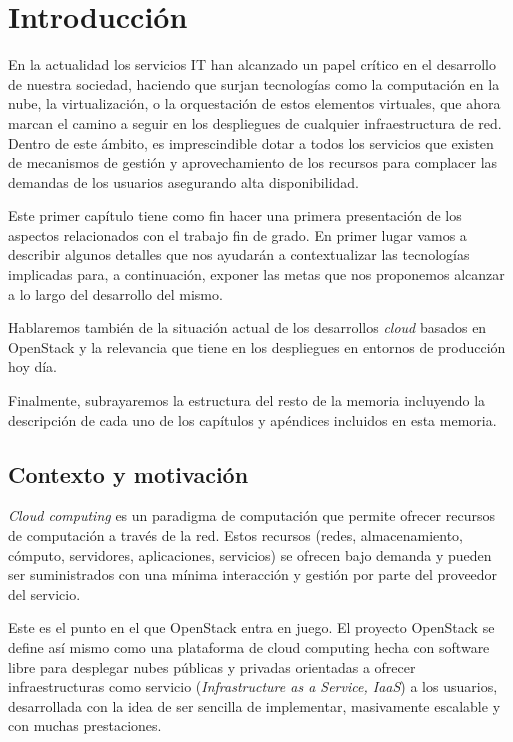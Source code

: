 \chapter{Introducción} 
\label{chap:introudccion}
En la actualidad los servicios IT han alcanzado un papel crítico en el desarrollo de nuestra sociedad, haciendo que surjan tecnologías como la computación en la nube, la virtualización, o la orquestación de estos elementos virtuales, que ahora marcan el camino a seguir en los despliegues de cualquier infraestructura de red. Dentro de este ámbito, es imprescindible dotar a todos los servicios que existen de mecanismos de gestión y aprovechamiento de los recursos para complacer las demandas de los usuarios asegurando alta disponibilidad.

Este primer capítulo tiene como fin hacer una primera presentación de los aspectos relacionados con el trabajo fin de grado. En primer lugar vamos a describir algunos detalles que nos ayudarán a contextualizar las tecnologías implicadas para, a continuación, exponer las metas que nos proponemos alcanzar a lo largo del desarrollo del mismo.

Hablaremos también de la situación actual de los desarrollos \textit{cloud} basados en OpenStack y la relevancia que tiene en los despliegues en entornos de producción hoy día.

Finalmente, subrayaremos la estructura del resto de la memoria incluyendo la descripción de cada uno de los capítulos y apéndices incluidos en esta memoria.

\section{Contexto y motivación}
\textit{Cloud computing} es un paradigma de computación que permite ofrecer recursos de computación a través de la red. Estos recursos (redes, almacenamiento, cómputo, servidores, aplicaciones, servicios) se ofrecen bajo demanda y pueden ser suministrados con una mínima interacción y gestión por parte del proveedor del servicio.

Este es el punto en el que OpenStack entra en juego. El proyecto OpenStack se define así mismo como una plataforma de cloud computing hecha con software libre para desplegar nubes públicas y privadas orientadas a ofrecer infraestructuras como servicio (\textit{Infrastructure as a Service, IaaS}) a los usuarios, desarrollada con la idea de ser sencilla de implementar, masivamente escalable y con muchas prestaciones.

